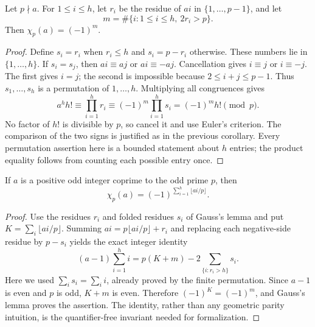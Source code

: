 \begin{theorem}\label{qr:gauss}
Let $p\nmid a$. For $1\le i\le h$, let $r_i$ be the residue of
$ai$ in $\{1,\ldots,p-1\}$, and let
\[
 m=\#\{i:1\le i\le h,\ 2r_i>p\}.
\]
Then $\chi_p(a)=(-1)^m$.
\end{theorem}
\begin{proof}
Define $s_i=r_i$ when $r_i\le h$ and $s_i=p-r_i$ otherwise.
These numbers lie in $\{1,\ldots,h\}$. If $s_i=s_j$, then
$ai\equiv aj$ or $ai\equiv-aj$. Cancellation gives $i\equiv j$
or $i\equiv-j$. The first gives $i=j$; the second is impossible
because $2\le i+j\le p-1$. Thus $s_1,\ldots,s_h$ is a permutation
of $1,\ldots,h$. Multiplying all congruences gives
\[
 a^h h!\equiv\prod_{i=1}^h r_i
       \equiv(-1)^m\prod_{i=1}^h s_i=(-1)^m h!\pmod p.
\]
No factor of $h!$ is divisible by $p$, so cancel it and use Euler's
criterion. The comparison of the two signs is justified as in the previous
corollary. Every permutation assertion here is a bounded statement about
$h$ entries; the product equality follows from counting each possible
entry once.
\end{proof}

\begin{lemma}\label{qr:eisenstein}
If $a$ is a positive odd integer coprime to the odd prime $p$, then
\[
 \chi_p(a)=(-1)^{\displaystyle\sum_{i=1}^{h}\lfloor ai/p\rfloor}.
\]
\end{lemma}
\begin{proof}
Use the residues $r_i$ and folded residues $s_i$ of Gauss's lemma and
put $K=\sum_i\lfloor ai/p\rfloor$. Summing $ai=p\lfloor ai/p\rfloor+r_i$
and replacing each negative-side residue by $p-s_i$ yields the exact
integer identity
\[
 (a-1)\sum_{i=1}^{h}i
   =p(K+m)-2\sum_{\{i:r_i>h\}}s_i.
\]
Here we used $\sum_i s_i=\sum_i i$, already proved by the finite
permutation. Since $a-1$ is even and $p$ is odd, $K+m$ is even.
Therefore $(-1)^K=(-1)^m$, and Gauss's lemma proves the assertion.
The identity, rather than any geometric parity intuition, is the
quantifier-free invariant needed for formalization.
\end{proof}

